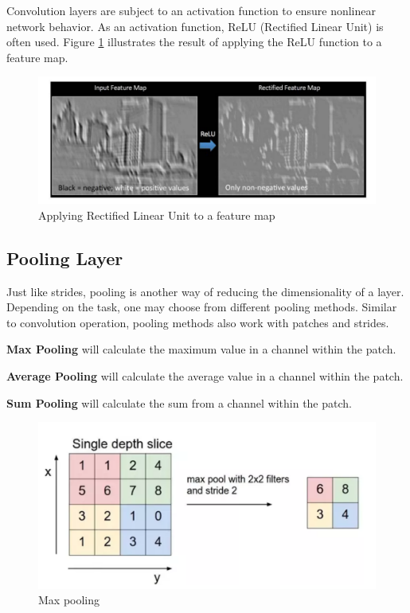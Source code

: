  Convolution layers are subject to an activation function to ensure nonlinear network behavior. 
 As an activation function, ReLU (Rectified Linear Unit) is often used. Figure \ref{fig:relu-exemple}
  illustrates the result of applying the ReLU function to a feature map.

  \begin{figure}[htbp]
    \centerline{\includegraphics[scale=0.75]{fig/relu.png}}  
    \caption{Applying Rectified Linear Unit to a feature map \cite{Mallat:2008:WTS:1525499}}
    \label{fig:relu-exemple}
  \end{figure}

\subsection{Pooling Layer}

Just like strides, pooling is another way of reducing the dimensionality of a layer.
Depending on the task, one may choose from different pooling methods.
Similar to convolution operation, pooling methods also
work with patches and strides. 


\textbf{Max Pooling} will calculate the maximum value in a channel within the patch.

\textbf{Average Pooling} will calculate the average value in a channel within the patch.

\textbf{Sum Pooling} will calculate the sum from a channel within the patch.


\begin{figure}[htbp]
  \centerline{\includegraphics[scale=0.75]{fig/max-pooling.png}}  
  \caption{Max pooling \cite{cnn-understanding}}
  \label{fig:max-pooling}
\end{figure}

